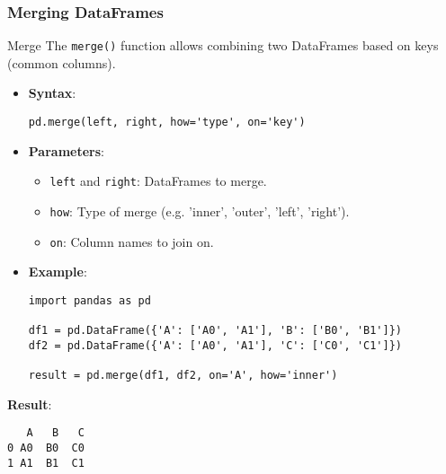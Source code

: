 \documentclass[aspectratio=169]{beamer}
\begin{document}
\begin{frame}[fragile]
    \frametitle{Merging DataFrames}
    \begin{block}{Merge}
        The \texttt{merge()} function allows combining two DataFrames based on keys (common columns).
        \begin{itemize}
            \item \textbf{Syntax}:
            \begin{lstlisting}
pd.merge(left, right, how='type', on='key')
            \end{lstlisting}
            \item \textbf{Parameters}:
            \begin{itemize}
                \item \texttt{left} and \texttt{right}: DataFrames to merge.
                \item \texttt{how}: Type of merge (e.g. 'inner', 'outer', 'left', 'right').
                \item \texttt{on}: Column names to join on.
            \end{itemize}
            \item \textbf{Example}:
            \begin{lstlisting}
import pandas as pd

df1 = pd.DataFrame({'A': ['A0', 'A1'], 'B': ['B0', 'B1']})
df2 = pd.DataFrame({'A': ['A0', 'A1'], 'C': ['C0', 'C1']})

result = pd.merge(df1, df2, on='A', how='inner')
            \end{lstlisting}
        \end{itemize}
        \textbf{Result}:
        \begin{lstlisting}
   A   B   C
0 A0  B0  C0
1 A1  B1  C1
        \end{lstlisting}
    \end{block}
\end{frame}
\end{document}
